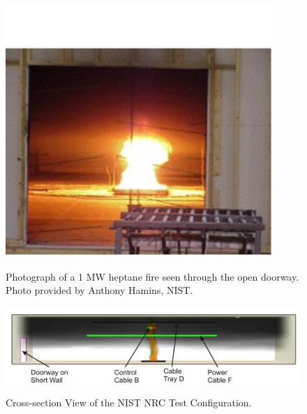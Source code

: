\begin{figure}[\figoptions{t}]
\begin{center}
\includegraphics[width=4.0in]{FIGURES/NIST_NRC/NISTNRC_1MW_fire}\\
\end{center}
\caption{Photograph of a 1 MW heptane fire seen through the open doorway. Photo provided by Anthony Hamins, NIST.}
 \label{fig:NISTNRC_1MW_fire}
\end{figure}

\begin{figure}[\figoptions{t}]
\begin{center}
\includegraphics[width=5.0in]{FIGURES/NIST_NRC/NISTNRC_Summary}\\
\end{center}
\caption{Cross-section View of the NIST NRC Test Configuration.}
 \label{fig:NISTNRC_Summary}
\end{figure}


